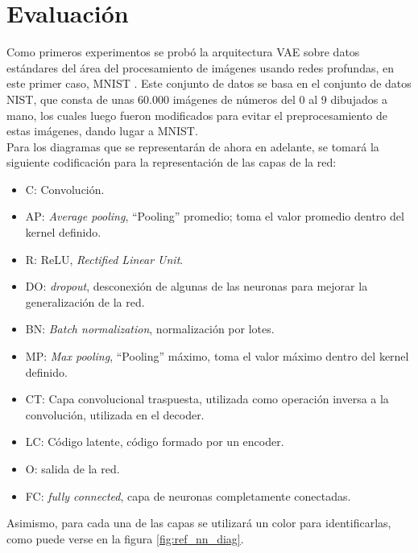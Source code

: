 \documentclass[12pt, spanish]{article}
\begin{document}
\section{Evaluación}%
\label{sec:evaluacion}
Como primeros experimentos se probó la arquitectura VAE sobre datos estándares
del área del procesamiento de imágenes usando redes profundas, en este
primer caso, MNIST \cite{LeCun1998GradientbasedLA}. Este conjunto de datos se
basa en el conjunto de datos NIST, que consta de unas 60.000 imágenes de
números del 0 al 9 dibujados a mano, los cuales luego fueron modificados para
evitar el preprocesamiento de estas imágenes, dando lugar a MNIST. \\
Para los diagramas que se representarán de ahora en adelante, se tomará la
siguiente codificación para la representación de las capas de la red:
\begin{itemize}
    \item C: Convolución.
    \item AP: \textit{Average pooling}, ``Pooling'' promedio; toma el valor
        promedio dentro del kernel definido.
    \item R: ReLU, \textit{Rectified Linear Unit}.
    \item DO: \textit{dropout}, desconexión de algunas de las neuronas para
        mejorar la generalización de la red.
    \item BN: \textit{Batch normalization}, normalización por lotes.
    \item MP: \textit{Max pooling}, ``Pooling'' máximo, toma el valor máximo
        dentro del kernel definido.
    \item CT: Capa convolucional traspuesta, utilizada como operación inversa
        a la convolución, utilizada en el decoder.
    \item LC: Código latente, código formado por un encoder.
    \item O: salida de la red.
    \item FC: \textit{fully connected}, capa de neuronas completamente
        conectadas.
\end{itemize}
Asimismo, para cada una de las capas se utilizará un color para identificarlas,
como puede verse en la figura \ref{fig:ref_nn_diag}.
\end{document}
